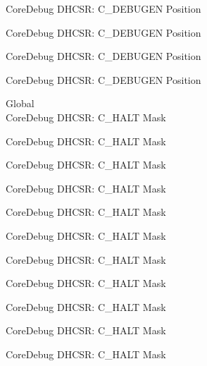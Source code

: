\begin{DoxyRefList}
\label{deprecated__deprecated001003}%
%
Core\+Debug DHCSR\+: C\+\_\+\+DEBUGEN Position 

\label{deprecated__deprecated001079}%
%
Core\+Debug DHCSR\+: C\+\_\+\+DEBUGEN Position 

\label{deprecated__deprecated001168}%
%
Core\+Debug DHCSR\+: C\+\_\+\+DEBUGEN Position 

\label{deprecated__deprecated001270}%
%
Core\+Debug DHCSR\+: C\+\_\+\+DEBUGEN Position  
\item[Global \doxylink{group___c_m_s_i_s___core_debug_ga1d905a3aa594eb2e8bb78bcc4da05b3f}{Core\+Debug\+\_\+\+DHCSR\+\_\+\+C\+\_\+\+HALT\+\_\+\+Msk} ]\hfill \\
\label{deprecated__deprecated000038}%
%
Core\+Debug DHCSR\+: C\+\_\+\+HALT Mask 

\label{deprecated__deprecated000126}%
%
Core\+Debug DHCSR\+: C\+\_\+\+HALT Mask 

\label{deprecated__deprecated000182}%
%
Core\+Debug DHCSR\+: C\+\_\+\+HALT Mask 

\label{deprecated__deprecated000265}%
%
Core\+Debug DHCSR\+: C\+\_\+\+HALT Mask 

\label{deprecated__deprecated000324}%
%
Core\+Debug DHCSR\+: C\+\_\+\+HALT Mask 

\label{deprecated__deprecated000400}%
%
Core\+Debug DHCSR\+: C\+\_\+\+HALT Mask 

\label{deprecated__deprecated000489}%
%
Core\+Debug DHCSR\+: C\+\_\+\+HALT Mask 

\label{deprecated__deprecated000591}%
%
Core\+Debug DHCSR\+: C\+\_\+\+HALT Mask 

\label{deprecated__deprecated000716}%
%
Core\+Debug DHCSR\+: C\+\_\+\+HALT Mask 

\label{deprecated__deprecated000804}%
%
Core\+Debug DHCSR\+: C\+\_\+\+HALT Mask 

\label{deprecated__deprecated000860}%
%
Core\+Debug DHCSR\+: C\+\_\+\+HALT Mask 


\end{DoxyRefList}
